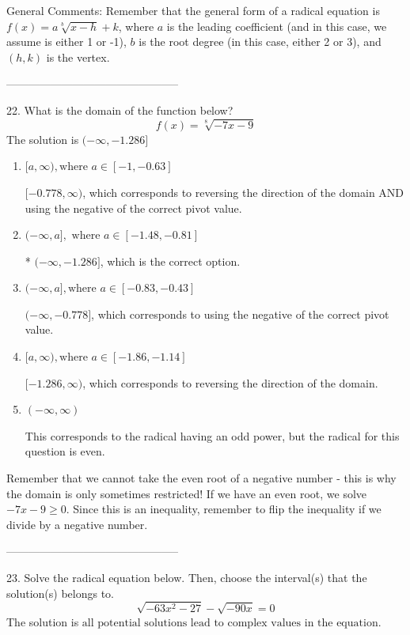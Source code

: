 \documentclass{article}[14pt]
\begin{document}
General Comments: Remember that the general form of a radical equation is $ f(x) = a \sqrt[b]{x - h} + k $, where $a$ is the leading coefficient (and in this case, we assume is either 1 or -1), $b$ is the root degree (in this case, either 2 or 3), and $(h, k)$ is the vertex.

-----------------------------------------------

22. What is the domain of the function below?
$$ f(x) = \sqrt[8]{-7 x - 9} $$ 
The solution is $ (-\infty, -1.286] $ 

\begin{enumerate}[label=\Alph*.] 
\item $ [a, \infty), \text{where } a \in [-1, -0.63] $ 

 $[-0.778, \infty)$, which corresponds to reversing the direction of the domain AND using the negative of the correct pivot value. 
\item $ (-\infty, a], \text{ where } a \in [-1.48, -0.81] $ 

 * $(-\infty, -1.286]$, which is the correct option. 
\item $ (-\infty, a], \text{where } a \in [-0.83, -0.43] $ 

 $(-\infty, -0.778]$, which corresponds to using the negative of the correct pivot value. 
\item $ [a, \infty), \text{where } a \in [-1.86, -1.14] $ 

  $[-1.286, \infty)$, which corresponds to reversing the direction of the domain. 
\item $ (-\infty, \infty) $ 

 This corresponds to the radical having an odd power, but the radical for this question is even. 
\end{enumerate} 
 
Remember that we cannot take the even root of a negative number - this is why the domain is only sometimes restricted! If we have an even root, we solve $-7 x - 9 \geq 0$. Since this is an inequality, remember to flip the inequality if we divide by a negative number.

-----------------------------------------------

23. Solve the radical equation below. Then, choose the interval(s) that the solution(s) belongs to.
$$ \sqrt{-63 x^2 - 27} - \sqrt{-90 x} = 0 $$ 
The solution is $ \text{all potential solutions lead to complex values in the equation.} $ 
\end{document}
